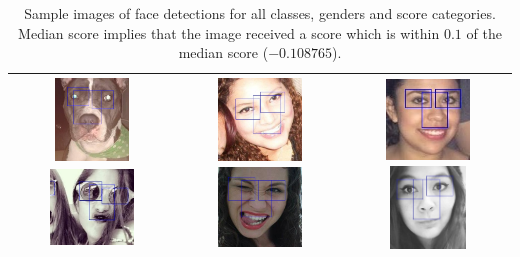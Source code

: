 \begin{table}[ht!]
\begin{center}
\begin{tabular}{c|c|c}
\includegraphics[height=2.2cm,width=2.2cm]{figures/results/detections/mexico/female/lq/c2c95a2c-293a-4ca8-83d4-a017bb5fabf5.jpeg}
\includegraphics[height=2.2cm,width=2.2cm]{figures/results/detections/mexico/female/lq/366053f9-8acc-49a4-83ff-4e26646b4ac4.jpeg}
&
\includegraphics[height=2.2cm,width=2.2cm]{figures/results/detections/mexico/female/mq/e076cb1c-95ed-49e5-9c3e-6c980882e1d2.jpeg}
\includegraphics[height=2.2cm,width=2.2cm]{figures/results/detections/mexico/female/mq/1d655959-309a-46a9-8338-eecf05251e84.jpeg}
&
\includegraphics[height=2.2cm,width=2.2cm]{figures/results/detections/mexico/female/hq/6a15e01f-3f9b-4d57-a4a8-bd26889f2f07.jpeg}
\includegraphics[height=2.2cm,width=2.2cm]{figures/results/detections/mexico/female/hq/dc74a9a6-8af7-4cae-84a1-181ddf6f6db7.jpeg}
\TBstrut \\ 




            \bottomrule


        \end{tabular}
    \end{center}
    \caption{Sample images of face detections for all classes, genders and
    score categories. Median score implies that the image received a score
which is within $0.1$ of the median score ($-0.108765$).}
    \label{fig:results:fd:scores}
\end{table}


